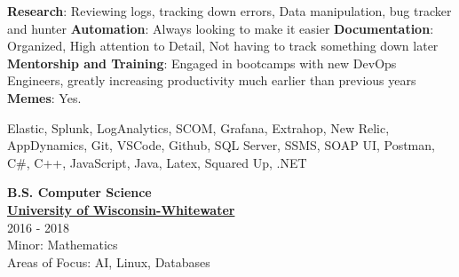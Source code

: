 \documentclass[a4paper]{mctemplate} %
\begin{document}
\begin{sidebar}

\makepicture{2.1cm}


\begin{contacttable}
\end{contacttable}


\begin{skilltable}
	\skillitem
	{\textbf{Research}: Reviewing logs, tracking down errors, Data manipulation, bug tracker and hunter}
	\skillitem
	{\textbf{Automation}: Always looking to make it easier}
	\skillitem
	{\textbf{Documentation}: Organized, High attention to Detail, Not having to track something down later}
	\skillitem
	{\textbf{Mentorship and Training}: Engaged in bootcamps with new DevOps Engineers, greatly increasing productivity much earlier than previous years}
	\skillitem
	{\textbf{Memes}: Yes.}
\end{skilltable}




\begin{codingtable}
	{Elastic, Splunk, LogAnalytics, SCOM, Grafana, Extrahop, New Relic, AppDynamics, Git, VSCode, Github, SQL Server, SSMS, SOAP UI, Postman, C\#, C++, JavaScript, Java, Latex, Squared Up, .NET}
\end{codingtable}

\begin{education}
    {\textbf{B.S. Computer Science}} \\ 
    {\href{https://www.uww.edu/}{\textbf{University of Wisconsin-Whitewater}}} \\
    {2016 - 2018} \\
    {Minor: Mathematics} \\
    {Areas of Focus: AI, Linux, Databases}
\end{education}

\end{sidebar}
\end{document}
